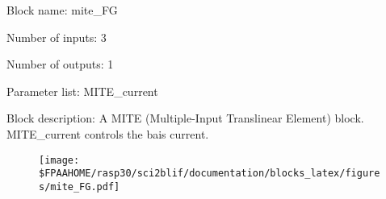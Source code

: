 \pagebreak

Block name: mite\_FG

Number of inputs: 3

Number of outputs: 1

Parameter list: MITE\_current

Block description: 
A MITE (Multiple-Input Translinear Element) block. MITE\_current controls the bais current.

\begin{figure}[H]  %
\texttt{[image: \$FPAAHOME/rasp30/sci2blif/documentation/blocks\_latex/figures/mite\_FG.pdf]}
\end{figure}

